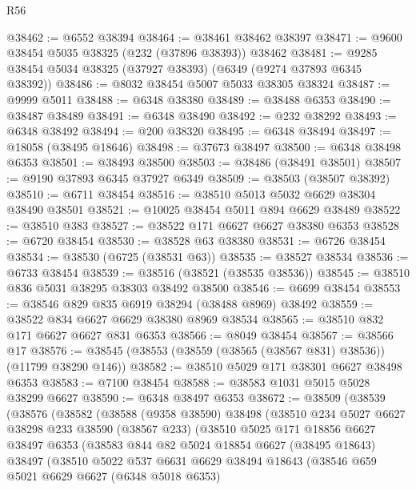 \begin{lexlean}{R56}
\begin{coremodule}
@38462 := @6552 @38394
@38464 := @38461 @38462 @38397
@38471 := @9600 @38454 @5035 @38325 (@232 (@37896 @38393)) @38462
@38481 := @9285 @38454 @5034 @38325 (@37927 @38393) (@6349 (@9274 @37893 @6345 @38392))
@38486 := @8032 @38454 @5007 @5033 @38305 @38324
@38487 := @9999 @5011
@38488 := @6348 @38380
@38489 := @38488 @6353
@38490 := @38487 @38489
@38491 := @6348 @38490
@38492 := @232 @38292
@38493 := @6348 @38492
@38494 := @200 @38320
@38495 := @6348 @38494
@38497 := @18058 (@38495 @18646)
@38498 := @37673 @38497
@38500 := @6348 @38498 @6353
@38501 := @38493 @38500
@38503 := @38486 (@38491 @38501)
@38507 := @9190 @37893 @6345 @37927 @6349
@38509 := @38503 (@38507 @38392)
@38510 := @6711 @38454
@38516 := @38510 @5013 @5032 @6629 @38304 @38490 @38501
@38521 := @10025 @38454 @5011 @894 @6629 @38489
@38522 := @38510 @383
@38527 := @38522 @171 @6627 @6627 @38380 @6353
@38528 := @6720 @38454
@38530 := @38528 @63 @38380
@38531 := @6726 @38454
@38534 := @38530 (@6725 (@38531 @63))
@38535 := @38527 @38534
@38536 := @6733 @38454
@38539 := @38516 (@38521 (@38535 @38536))
@38545 := @38510 @836 @5031 @38295 @38303 @38492 @38500
@38546 := @6699 @38454
@38553 := @38546 @829 @835 @6919 @38294 (@38488 @8969) @38492
@38559 := @38522 @834 @6627 @6629 @38380 @8969 @38534
@38565 := @38510 @832 @171 @6627 @6627 @831 @6353
@38566 := @8049 @38454
@38567 := @38566 @17
@38576 := @38545 (@38553 (@38559 (@38565 (@38567 @831) @38536)) (@11799 @38290 @146))
@38582 := @38510 @5029 @171 @38301 @6627 @38498 @6353
@38583 := @7100 @38454
@38588 := @38583 @1031 @5015 @5028 @38299 @6627
@38590 := @6348 @38497 @6353
@38672 := @38509
    (@38539
      (@38576
        (@38582
          (@38588
            (@9358 @38590)
            @38498
            (@38510
              @234
              @5027
              @6627
              @38298
              @233
              @38590
              (@38567 @233)
              (@38510
                @5025
                @171
                @18856
                @6627
                @38497
                @6353
                (@38583
                  @844
                  @82
                  @5024
                  @18854
                  @6627
                  (@38495 @18643)
                  @38497
                  (@38510
                    @5022
                    @537
                    @6631
                    @6629
                    @38494
                    @18643
                    (@38546
                      @659
                      @5021
                      @6629
                      @6627
                      (@6348 @5018 @6353)

\end{coremodule}
\end{lexlean}
